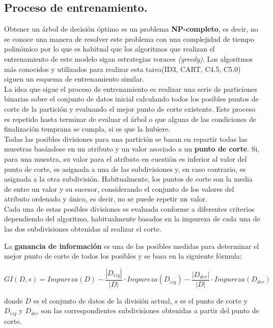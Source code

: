 \subsection{Proceso de entrenamiento.} 

Obtener un árbol de decisión óptimo es un problema \textbf{NP-completo}, es decir, no se conoce una manera de resolver este problema con una complejidad de tiempo polinómico por lo que es habitual que los algoritmos que realizan el entrenamiento de este modelo sigan estrategias voraces \textit{(greedy)}. Los algoritmos más conocidos y utilizados para realizar esta tarea(ID3, CART, C4.5, C5.0) siguen un esquema de entrenamiento similar. \\

La idea que sigue el proceso de entrenamiento es realizar una serie de particiones binarias sobre el conjunto de datos inicial calculando todos los posibles puntos de corte de la partición y evaluando el mejor punto de corte existente. Este proceso es repetido hasta terminar de evaluar el árbol o que alguna de las condiciones de finalización temprana se cumpla, si es que la hubiere.\\

Todas las posibles divisiones para una partición se basan en repartir todas las muestras basándose en un atributo y un valor asociado a un \textbf{punto de corte}. Si, para una muestra, su valor para el atributo en cuestión es inferior al valor del punto de corte, es asignada a una de las subdivisiones y, en caso contrario, es asignada a la otra subdivisión. Habitualmente, los puntos de corte son la media de entre un valor y su sucesor, considerando el conjunto de los valores del atributo ordenado y único, es decir, no se puede repetir un valor.\\

Cada una de estas posibles divisiones es evaluada conforme a diferentes criterios dependiendo del algoritmo, habitualmente basados en la impureza de cada una de las dos subdivisiones obtenidas al realizar el corte. 

La \textbf{ganancia de información} es una de las posibles medidas para determinar el mejor punto de corte de todos los posibles y se basa en la siguiente fórmula:

$$
GI(D,s) = Impureza(D) - \frac{|D_{izq}|}{|D|} \cdot Impureza(D_{izq}) - \frac{|D_{der}|}{|D|} \cdot Impureza(D_{der})
$$

donde $D$ es el conjunto de datos de la división actual, $s$ es el punto de corte y $D_{izq}$ y $D_{der}$ son las correspondientes subdivisiones obtenidas a partir del punto de corte.\\

